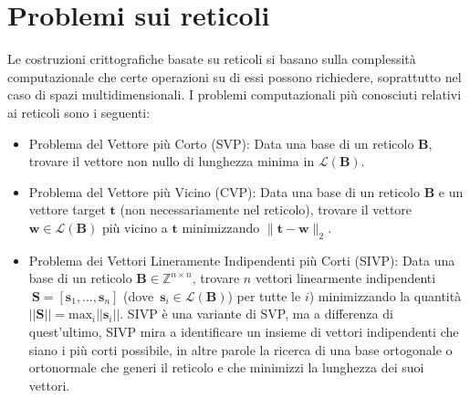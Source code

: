 \section{Problemi sui reticoli}
\label{problemi}
Le costruzioni crittografiche basate su reticoli si basano sulla complessità 
computazionale che certe operazioni su di essi possono richiedere, 
soprattutto nel caso di spazi multidimensionali. I problemi computazionali 
più conosciuti relativi ai reticoli sono i seguenti:
\begin{itemize}
    \item Problema del Vettore più Corto (SVP): Data una base di un reticolo $\mathbf{B}$, 
    trovare il vettore non nullo di lunghezza minima in $\mathcal{L}(\mathbf{B})$.
    \item Problema del Vettore più Vicino (CVP): Data una base di un reticolo $\mathbf{B}$ e un 
    vettore target $\mathbf{t}$ (non necessariamente nel reticolo), trovare il vettore 
    $\mathbf{w} \in \mathcal{L}(\mathbf{B})$ più vicino a $\mathbf{t}$ minimizzando 
    $\|\mathbf{t}-\mathbf{w}\|_2$.
    \item Problema dei Vettori Lineramente Indipendenti più Corti (SIVP): Data una base di un reticolo 
    $\mathbf{B} \in \mathbb{Z}^{n\times n}$, trovare $n$ vettori linearmente indipendenti 
    $\ {\mathbf{S} = [\mathbf{s}_1, \dots, \mathbf{s}_n]}$ 
    \mbox{(dove  $\mathbf{s}_i \in \mathcal{L}(\mathbf{B})$)}
    per tutte le $i$) minimizzando la quantità 
    ${||\mathbf{S}|| = \text{max}_i||\mathbf{s}_i||}$. 
    SIVP è una variante di SVP, ma a differenza di quest'ultimo, SIVP mira a identificare 
    un insieme di vettori indipendenti che siano i più corti possibile, in altre parole 
    la ricerca di una base ortogonale o ortonormale che generi il reticolo e che minimizzi
     la lunghezza dei suoi vettori.
    \end{itemize}

